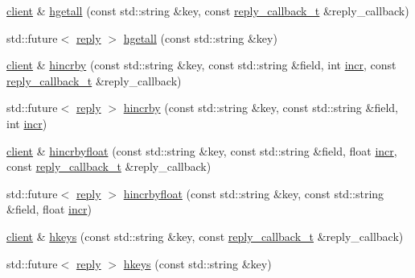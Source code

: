 \begin{DoxyCompactItemize}
\item 
\hyperlink{classcpp__redis_1_1client}{client} \& \hyperlink{classcpp__redis_1_1client_a8bd82cb86dad87a944c039a57bf67968}{hgetall} (const std\+::string \&key, const \hyperlink{classcpp__redis_1_1client_a061a1140d36d2eaeda82b09a0bb3f9f2}{reply\+\_\+callback\+\_\+t} \&reply\+\_\+callback)
\item 
std\+::future$<$ \hyperlink{classcpp__redis_1_1reply}{reply} $>$ \hyperlink{classcpp__redis_1_1client_a44321960e02c6ee6b6b36ffc960e4257}{hgetall} (const std\+::string \&key)
\item 
\hyperlink{classcpp__redis_1_1client}{client} \& \hyperlink{classcpp__redis_1_1client_a517b6bdeb07edf20f5e57eb1b4942dd5}{hincrby} (const std\+::string \&key, const std\+::string \&field, int \hyperlink{classcpp__redis_1_1client_a2f9ba6c7e83451207403096b19da4faa}{incr}, const \hyperlink{classcpp__redis_1_1client_a061a1140d36d2eaeda82b09a0bb3f9f2}{reply\+\_\+callback\+\_\+t} \&reply\+\_\+callback)
\item 
std\+::future$<$ \hyperlink{classcpp__redis_1_1reply}{reply} $>$ \hyperlink{classcpp__redis_1_1client_aee1f9d8b1fe77bc5bed18000a9cf8b6f}{hincrby} (const std\+::string \&key, const std\+::string \&field, int \hyperlink{classcpp__redis_1_1client_a2f9ba6c7e83451207403096b19da4faa}{incr})
\item 
\hyperlink{classcpp__redis_1_1client}{client} \& \hyperlink{classcpp__redis_1_1client_ade2a386b51e8bbd59cd7feef51bd0637}{hincrbyfloat} (const std\+::string \&key, const std\+::string \&field, float \hyperlink{classcpp__redis_1_1client_a2f9ba6c7e83451207403096b19da4faa}{incr}, const \hyperlink{classcpp__redis_1_1client_a061a1140d36d2eaeda82b09a0bb3f9f2}{reply\+\_\+callback\+\_\+t} \&reply\+\_\+callback)
\item 
std\+::future$<$ \hyperlink{classcpp__redis_1_1reply}{reply} $>$ \hyperlink{classcpp__redis_1_1client_a6b856272a5956b3b2839c5b5749c9b97}{hincrbyfloat} (const std\+::string \&key, const std\+::string \&field, float \hyperlink{classcpp__redis_1_1client_a2f9ba6c7e83451207403096b19da4faa}{incr})
\item 
\hyperlink{classcpp__redis_1_1client}{client} \& \hyperlink{classcpp__redis_1_1client_a432f322ff1818fa65208725b1be7f4d2}{hkeys} (const std\+::string \&key, const \hyperlink{classcpp__redis_1_1client_a061a1140d36d2eaeda82b09a0bb3f9f2}{reply\+\_\+callback\+\_\+t} \&reply\+\_\+callback)
\item 
std\+::future$<$ \hyperlink{classcpp__redis_1_1reply}{reply} $>$ \hyperlink{classcpp__redis_1_1client_a578dade240f8fbbd6ba797bff9be18dd}{hkeys} (const std\+::string \&key)

\end{DoxyCompactItemize}
